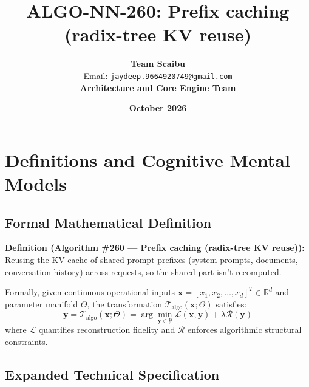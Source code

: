 \documentclass[11pt,a4paper]{article}
\title{\textbf{ALGO-NN-260: Prefix caching (radix-tree KV reuse)}}
\author{\textbf{Team Scaibu} \\ \small Email: \texttt{jaydeep.9664920749@gmail.com} \\ \small \textbf{Architecture and Core Engine Team}}
\date{\textbf{October 2026}}
\theoremstyle{definition}
\begin{document}
\maketitle

\section{Definitions and Cognitive Mental Models}

\subsection{Formal Mathematical Definition}
\textbf{Definition (Algorithm \#260 --- Prefix caching (radix-tree KV reuse)):}
Reusing the KV cache of shared prompt prefixes (system prompts, documents, conversation history) across requests, so the shared part isn't recomputed.

Formally, given continuous operational inputs $\mathbf{x} = [x_1, x_2, \dots, x_d]^T \in \mathbb{R}^d$ and parameter manifold $\Theta$, the transformation $\mathcal{T}_{\text{algo}}(\mathbf{x}; \Theta)$ satisfies:
{\boldmath
\begin{equation}
\mathbf{y} = \mathcal{T}_{\text{algo}}(\mathbf{x}; \Theta) = \arg\min_{\mathbf{y} \in \mathcal{Y}} \mathcal{L}(\mathbf{x}, \mathbf{y}) + \lambda \mathcal{R}(\mathbf{y})
\end{equation}
}
where $\mathcal{L}$ quantifies reconstruction fidelity and $\mathcal{R}$ enforces algorithmic structural constraints.

\subsection{Expanded Technical Specification}
\end{document}
